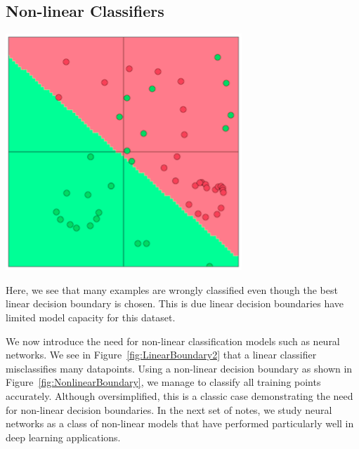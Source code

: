 \documentclass{tufte-handout}
\begin{document}
\subsection{Non-linear Classifiers}

\begin{marginfigure}%
  \includegraphics[width = \linewidth]{LinearBoundary2}
  \caption{Here, we see that many examples are wrongly classified even though the best linear decision boundary is chosen. This is due linear decision boundaries have limited model capacity for this dataset.}
    \label{fig:LinearBoundary2}
\end{marginfigure}

We now introduce the need for non-linear classification models such as neural networks. We see in Figure~\ref{fig:LinearBoundary2} that a linear classifier misclassifies many datapoints. Using a non-linear decision boundary as shown in Figure~\ref{fig:NonlinearBoundary}, we manage to classify all training points accurately. Although oversimplified, this is a classic case demonstrating the need for non-linear decision boundaries. In the next set of notes, we study neural networks as a class of non-linear models that have performed particularly well in deep learning applications.
\end{document}
